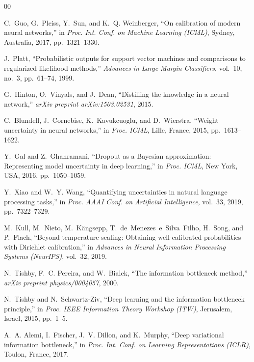 \documentclass[conference]{IEEEtran}
\begin{document}
\begin{thebibliography}{00}

C.~Guo, G.~Pleiss, Y.~Sun, and K.~Q. Weinberger,
``On calibration of modern neural networks,''
in \textit{Proc. Int. Conf. on Machine Learning (ICML)},
Sydney, Australia, 2017, pp.~1321--1330.

J.~Platt,
``Probabilistic outputs for support vector machines and comparisons
to regularized likelihood methods,''
\textit{Advances in Large Margin Classifiers},
vol.~10, no.~3, pp.~61--74, 1999.

G.~Hinton, O.~Vinyals, and J.~Dean,
``Distilling the knowledge in a neural network,''
\textit{arXiv preprint arXiv:1503.02531}, 2015.

C.~Blundell, J.~Cornebise, K.~Kavukcuoglu, and D.~Wierstra,
``Weight uncertainty in neural networks,''
in \textit{Proc. ICML}, Lille, France, 2015, pp.~1613--1622.

Y.~Gal and Z.~Ghahramani,
``Dropout as a Bayesian approximation: Representing model uncertainty
in deep learning,''
in \textit{Proc. ICML}, New York, USA, 2016, pp.~1050--1059.

Y.~Xiao and W.~Y. Wang,
``Quantifying uncertainties in natural language processing tasks,''
in \textit{Proc. AAAI Conf. on Artificial Intelligence},
vol.~33, 2019, pp.~7322--7329.

M.~Kull, M.~Nieto, M.~K\"{a}ngsepp, T.~de~Menezes~e~Silva~Filho,
H.~Song, and P.~Flach,
``Beyond temperature scaling: Obtaining well-calibrated probabilities
with Dirichlet calibration,''
in \textit{Advances in Neural Information Processing Systems (NeurIPS)},
vol.~32, 2019.

N.~Tishby, F.~C. Pereira, and W.~Bialek,
``The information bottleneck method,''
\textit{arXiv preprint physics/0004057}, 2000.

N.~Tishby and N.~Schwartz-Ziv,
``Deep learning and the information bottleneck principle,''
in \textit{Proc. IEEE Information Theory Workshop (ITW)},
Jerusalem, Israel, 2015, pp.~1--5.

A.~A. Alemi, I.~Fischer, J.~V. Dillon, and K.~Murphy,
``Deep variational information bottleneck,''
in \textit{Proc. Int. Conf. on Learning Representations (ICLR)},
Toulon, France, 2017.


\end{thebibliography}
\end{document}

